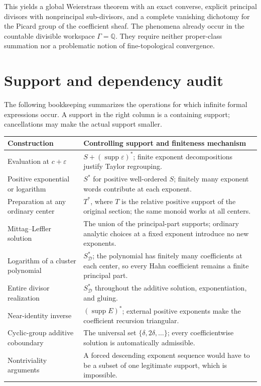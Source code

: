 \documentclass[11pt,letterpaper]{article}
\theoremstyle{definition}
\theoremstyle{remark}
\newcommand{\Q}{\mathbb Q}
\newcommand{\supp}{\operatorname{supp}}
\numberwithin{equation}{section}
\begin{document}
This yields a global Weierstrass theorem with an exact converse, explicit principal divisors with nonprincipal sub-divisors, and a complete vanishing dichotomy for the Picard group of the coefficient sheaf. The phenomena already occur in the countable divisible workspace $\Gamma=\Q$. They require neither proper-class summation nor a problematic notion of fine-topological convergence.

\appendix
\section{Support and dependency audit}\label{app:audit}
The following bookkeeping summarizes the operations for which infinite formal expressions occur. A support in the right column is a containing support; cancellations may make the actual support smaller.

\begin{center}\small
\begin{longtable}{@{}L{0.36\textwidth}L{0.53\textwidth}@{}}
\toprule
Construction & Controlling support and finiteness mechanism\\
\midrule
\endhead
Evaluation at $c+\varepsilon$ & $S+(\supp\varepsilon)^*$; finite exponent decompositions justify Taylor regrouping.\\[0.45em]
Positive exponential or logarithm & $S^*$ for positive well-ordered $S$; finitely many exponent words contribute at each exponent.\\[0.45em]
Preparation at any ordinary center & $T^*$, where $T$ is the relative positive support of the original section; the same monoid works at all centers.\\[0.45em]
Mittag--Leffler solution & The union of the principal-part supports; ordinary analytic choices at a fixed exponent introduce no new exponents.\\[0.45em]
Logarithm of a cluster polynomial & $S_{\mathcal D}^*$; the polynomial has finitely many coefficients at each center, so every Hahn coefficient remains a finite principal part.\\[0.45em]
Entire divisor realization & $S_{\mathcal D}^*$ throughout the additive solution, exponentiation, and gluing.\\[0.45em]
Near-identity inverse & $(\supp E)^*$; external positive exponents make the coefficient recursion triangular.\\[0.45em]
Cyclic-group additive coboundary & The universal set $\{\delta,2\delta,\ldots\}$; every coefficientwise solution is automatically admissible.\\[0.45em]
Nontriviality arguments & A forced descending exponent sequence would have to be a subset of one legitimate support, which is impossible.\\
\bottomrule
\end{longtable}
\end{center}
\end{document}
